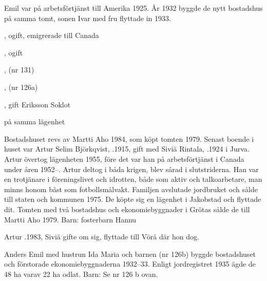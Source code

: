 Emil var på arbetsförtjänst till Amerika 1925. År 1932 byggde de nytt bostadshus på samma tomt, sonen Ivar med fru flyttade in 1933.
\begin{jhchildren}
  \item {}, ogift, emigrerade till Canada
  \item {}, ogift
  \item {}, (nr 131)
  \item {}, (nr 126a)
  \item {}, gift Eriksson Soklot
\end{jhchildren}


%
 på samma lägenhet



%
Bostadshuset revs av Martti Aho 1984, som köpt tomten 1979. Senast boende i huset var Artur Selim Björkqvist, .1915, gift med Siviä Rintala, .1924 i Jurva. Artur övertog lägenheten 1955, före det var han på arbetsförtjänst i Canada under åren 1952--. Artur deltog i båda krigen, blev sårad i slutstriderna.  Han var  en trotjänare i föreningslivet och idrotten, både som aktiv och talkoarbetare, man minns honom bäst som fotbollsmålvakt.  Familjen avslutade jordbruket och sålde till staten och kommunen 1975. De köpte sig en lägenhet i Jakobstad och flyttade dit. Tomten med två bostadshus och ekonomiebyggnader i Grötas sålde de till Martti Aho 1979.
Barn: fosterbarn Hannu

Artur .1983, Siviä gifte om sig, flyttade till Vörå där hon dog.


%
Anders Emil med hustrun Ida Maria och barnen (nr 126b) byggde bostadshuset och förstorade ekonomiebyggnaderna 1932--33. Enligt jordregistret 1935 ägde de 48 ha varav 22 ha odlat.
Barn: Se nr 126 b ovan.

